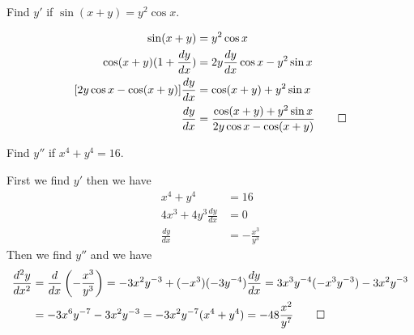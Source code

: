 \begin{problem}
    Find \(y'\) if \(\sin(x+y)=y^2\cos x\).
\end{problem}
\begin{solution}
    \begin{align*}
        \sin(x+y) &= y^2\cos x \\
        \cos(x+y)(1+\frac{dy}{dx}) &= 2y\frac{dy}{dx}\cos x-y^2\sin x \\
        [2y\cos x-\cos(x+y)]\frac{dy}{dx} &= \cos(x+y)+y^2\sin x \\
        \frac{dy}{dx}
        &= \frac{\cos(x+y)+y^2\sin x}{2y\cos x-\cos(x+y)} \qedhere
    \end{align*}
\end{solution}
\begin{problem}
    Find \(y''\) if \(x^4+y^4=16\).
\end{problem}
\begin{solution}
    First we find \(y'\) then we have
    \begin{align*}
        x^4+y^4 &= 16 \\ 4x^3+4y^3\frac{dy}{dx} &= 0 \\
        \frac{dy}{dx} &= -\frac{x^3}{y^3}
    \end{align*}
    Then we find \(y''\) and we have
    \begin{align*}
        \frac{d^2y}{dx^2} &= \frac{d}{dx}\left(-\frac{x^3}{y^3}\right)
        =-3x^2y^{-3}+(-x^3)(-3y^{-4})\frac{dy}{dx}
        =3x^3y^{-4}(-x^3y^{-3})-3x^2y^{-3} \\
        &= -3x^6y^{-7}-3x^2y^{-3}
        =-3x^2y^{-7}(x^4+y^4)=-48\frac{x^2}{y^7} \qedhere
    \end{align*}
\end{solution}